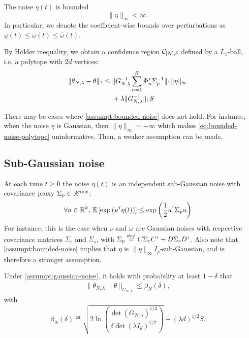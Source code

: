 \documentclass{article}
\begin{document}
\begin{assumption}
\label{assumpt:bounded-noise}
The noise $\eta(t)$ is bounded
\[
\|\eta\|_\infty < \infty.
\]
In particular, we denote the coefficient-wise bounds over perturbations as $\underline{\omega}(t) \leq \omega(t) \leq \overline{\omega}(t)$.
\end{assumption}

By Hölder inequality, we obtain a confidence region $\mathcal{C}_{[N],\delta}$ defined by a $L_1$-ball, i.e. a polytope with $2d$ vertices:
\begin{equation}
\begin{split}
\label{eq:bounded-noise-polytope}
\|\theta_{N,\lambda} - \theta\|_1 \leq {} &\|G_{N, \lambda}^{-1}\sum_{n=1}^N \Phi_n^{\mathsf{\scriptscriptstyle T}} \Sigma_p^{-1}\|_1\|\eta\|_\infty \\
&+ \lambda\|G_{N, \lambda}^{-1}\|_1 S
\end{split}
\end{equation}

There may be cases where \autoref{assumpt:bounded-noise} does not hold. For instance, when the noise $\eta$ is Gaussian, then $\|\eta\|_\infty=+\infty$ which makes \eqref{eq:bounded-noise-polytope} uninformative. Then, a weaker assumption can be made.

\subsection{Sub-Gaussian noise}

\begin{assumption}
\label{assumpt:gaussian-noise}
At each time $t\geq0$ the noise $\eta(t)$ is an independent sub-Gaussian noise with covariance proxy $\Sigma_p \in \mathbb{R}^{p\times p}$:
\begin{equation*}
    \forall u\in\mathbb{R}^k,\, \operatorname*{\mathbb{E}} \left[ \exp{\left( u^{\mathsf{\scriptscriptstyle T}}\eta(t)\right)}\right] \leq \exp{\left( \frac{1}{2} u^{\mathsf{\scriptscriptstyle T}}\Sigma_p u\right)}
\end{equation*}
For instance, this is the case when $\nu$ and $\omega$ are Gaussian noises with respective covariance matrices $\Sigma_r$ and $\Sigma_s$, with $\Sigma_p \stackrel{def}{=} C\Sigma_r C^{\mathsf{\scriptscriptstyle T}} + D\Sigma_s D^{\mathsf{\scriptscriptstyle T}}$. Also note that \autoref{assumpt:bounded-noise} implies that $\eta$ is $\|\eta\|_\infty I_p$-sub-Gaussian, and is therefore a stronger assumption.
\end{assumption}

\begin{theorem}
\label{thm:confidence_ellipsoid}
Under \autoref{assumpt:gaussian-noise}, it holds with probability at least $1-\delta$ that
\begin{align}
    \label{eq:confidence-ellipsoid}
    \| \theta_{N,\lambda}  - \theta\|_{G_{N,\lambda}} \leq \beta_N(\delta),
\end{align}
with
\begin{equation}
    \beta_N(\delta)\eqdef \sqrt{2\ln \left(\frac{\det(G_{N,\lambda})^{1/2}}{\delta\det(\lambda I_d)^{1/2}}\right)}
     + (\lambda d)^{1/2}S.
\end{equation}
\end{theorem}
\end{document}
